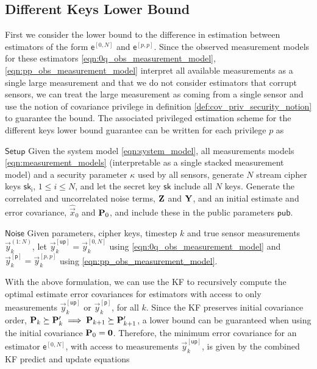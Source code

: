 \documentclass[conference]{IEEEtran}
\theoremstyle{definition}
\theoremstyle{remark}
\begin{document}
\subsection{Different Keys Lower Bound}\label{subsec:crypto_different_keys_lower_bound}
First we consider the lower bound to the difference in estimation between estimators of the form $\mathsf{e}^{[0,N]}$ and $\mathsf{e}^{[p,p]}$. Since the observed measurement models for these estimators \eqref{eqn:0q_obs_measurement_model}, \eqref{eqn:pp_obs_measurement_model} interpret all available measurements as a single large measurement and that we do not consider estimators that corrupt sensors, we can treat the large measurement as coming from a single sensor and use the notion of covariance privilege in definition \ref{def:cov_priv_security_notion} to guarantee the bound. The associated privileged estimation scheme for the different keys lower bound guarantee can be written for each privilege $p$ as
\begin{LaTeXdescription}
  \item[$\mathsf{Setup}$] Given the system model \eqref{eqn:system_model}, all measurements models \eqref{eqn:measurement_models} (interpretable as a single stacked measurement model) and a security parameter $\kappa$ used by all sensors, generate $N$ stream cipher keys $\mathsf{sk_i}$, $1\leq i \leq N$, and let the secret key $\mathsf{sk}$ include all $N$ keys. Generate the correlated and uncorrelated noise terms, ${{\mathbf{Z}}}$ and ${{\mathbf{Y}}}$, and an initial estimate and error covariance, $\hat{\vec{x}}_0$ and ${{\mathbf{P}}}_0$, and include these in the public parameters $\mathsf{pub}$.
  
  \item[$\mathsf{Noise}$] Given parameters, cipher keys, timestep $k$ and true sensor measurements $\vec{y}_k^{(1:N)}$, let $\vec{y}_k^{[\mathsf{up}]}=\vec{y}_k^{[0,N]}$ using \eqref{eqn:0q_obs_measurement_model} and $\vec{y}_k^{[\mathsf{p}]}=\vec{y}_k^{[p,p]}$ using \eqref{eqn:pp_obs_measurement_model}.
\end{LaTeXdescription}
With the above formulation, we can use the KF to recursively compute the optimal estimate error covariances for estimators with access to only measurements $\vec{y}_k^{[\mathsf{up}]}$ or $\vec{y}_k^{[\mathsf{p}]}$, for all $k$. Since the KF preserves initial covariance order, ${{\mathbf{P}}}_k \succeq {\ensuremath{{\mathbf{P}}}}_k^\prime \implies {\ensuremath{{\mathbf{P}}}}_{k+1} \succeq {\ensuremath{{\mathbf{P}}}}_{k+1}^\prime$, a lower bound can be guaranteed when using the initial covariance ${{\mathbf{P}}}_0={{\mathbf{0}}}$. Therefore, the minimum error covariance for an estimator $\mathsf{e}^{[0,N]}$, with access to measurements $\vec{y}_k^{[\mathsf{up}]}$, is given by the combined KF predict and update equations
\end{document}
